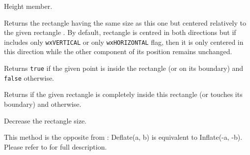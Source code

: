 
Height member.


\label{wxrectcentrein}



Returns the rectangle having the same size as this one but centered relatively
to the given rectangle . By default, rectangle is centred in both
directions but if  includes only \texttt{wxVERTICAL} or only 
\texttt{wxHORIZONTAL} flag, then it is only centered in this direction while
the other component of its position remains unchanged.


\label{wxrectcontains}



Returns {\tt true} if the given point is inside the rectangle (or on its
boundary) and {\tt false} otherwise.


Returns \true if the given rectangle is completely inside this rectangle
(or touches its boundary) and \false otherwise.


\label{wxrectdeflate}





Decrease the rectangle size.

This method is the opposite from :
Deflate(a, b) is equivalent to Inflate(-a, -b).
Please refer to  for full description.




\label{wxrectgetbottom}


